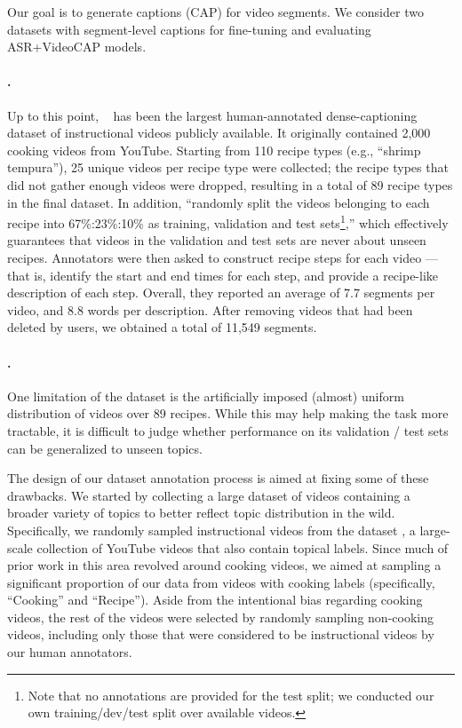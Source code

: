 \documentclass[11pt,a4paper]{article}
\begin{document}
Our goal is to generate captions (CAP) for video segments. We consider two datasets with segment-level captions for fine-tuning and evaluating ASR+VideoCAP models. 



\paragraph{\youcook.} Up to this point, \youcook~\citep{zhou2018towards} has been the largest human-annotated dense-captioning dataset of instructional videos publicly available.  It originally contained 2,000 cooking videos from YouTube.
Starting from 110 recipe types (e.g., ``shrimp tempura''), 25 unique videos per recipe type were collected; the recipe types that did not gather enough videos were dropped, resulting in a total of 89 recipe types in the final dataset. In addition,  ``randomly split the videos belonging to each recipe into 67\%:23\%:10\% as training, validation and test sets\footnote{Note that no annotations are provided for the test split; we conducted our own training/dev/test split over available videos.},'' which effectively guarantees that videos in the validation and test sets are never about unseen recipes.  
Annotators were then asked to construct recipe steps for each video --- that is, identify the start and end times for each step, and provide a recipe-like description of each step.
Overall, they reported an average of 7.7 segments per video, and 8.8 words per description.  
After removing videos that had been deleted by users, we obtained a total of 11,549 segments.



\paragraph{\ldvm.} One limitation of the \youcook dataset is the artificially imposed (almost) uniform distribution of videos over 89 recipes.  While this may help making the task more tractable, 
it is difficult to judge whether performance on its validation / test sets can be generalized to unseen topics.

The design of our \ldvm dataset annotation process is aimed at fixing some of these drawbacks.
We started by collecting a large dataset of videos containing a broader variety of topics to better reflect topic distribution in the wild.
Specifically, we randomly sampled instructional videos from the \ytdata dataset \citep{abu2016youtube}, a large-scale collection of YouTube videos that also contain topical labels.
Since much of prior work in this area revolved around cooking videos, we aimed at sampling a significant proportion of our data from videos with cooking labels (specifically, ``Cooking'' and ``Recipe'').
Aside from the intentional bias regarding cooking videos, the rest of the videos were selected by randomly sampling non-cooking videos, including only those that were considered to be instructional videos by our human annotators.
\end{document}
